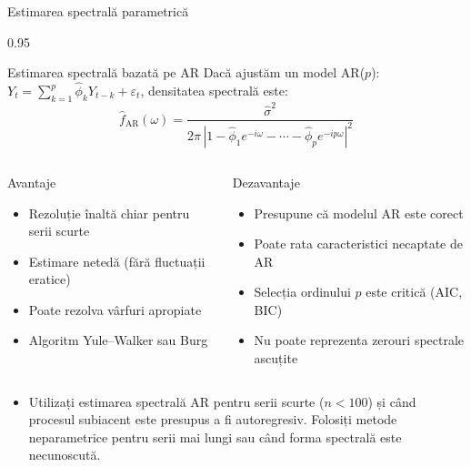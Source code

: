 \documentclass[9pt, aspectratio=169, t]{beamer}
\begin{document}
\begin{frame}{Estimarea spectrală parametrică}
    \begin{cminipage}{0.95\textwidth}
    \vspace{-2mm}
    \begin{block}{Estimarea spectrală bazată pe AR}
        {\small Dacă ajustăm un model AR($p$): $Y_t = \sum_{k=1}^p \hat{\phi}_k Y_{t-k} + \varepsilon_t$, densitatea spectrală este:
        \[
            \hat{f}_{\text{AR}}(\omega) = \frac{\hat{\sigma}^2}{2\pi\,|1 - \hat{\phi}_1 e^{-i\omega} - \cdots - \hat{\phi}_p e^{-ip\omega}|^2}
        \]
        }
    \end{block}
    \vspace{-2mm}
    \begin{columns}[T]
        \begin{exampleblock}{Avantaje}
            \begin{itemize}\setlength{\itemsep}{0pt}
                \item Rezoluție înaltă chiar pentru serii scurte
                \item Estimare netedă (fără fluctuații eratice)
                \item Poate rezolva vârfuri apropiate
                \item Algoritm Yule--Walker sau Burg
            \end{itemize}
        \end{exampleblock}

        \begin{alertblock}{Dezavantaje}
            \begin{itemize}\setlength{\itemsep}{0pt}
                \item Presupune că modelul AR este corect
                \item Poate rata caracteristici necaptate de AR
                \item Selecția ordinului $p$ este critică (AIC, BIC)
                \item Nu poate reprezenta zerouri spectrale ascuțite
            \end{itemize}
        \end{alertblock}
    \end{columns}
    \vspace{1mm}
    \begin{itemize}\setlength{\itemsep}{0pt}
        \item[\textbf{Recomandare practică}:] Utilizați estimarea spectrală AR pentru serii scurte ($n < 100$) și când procesul subiacent este presupus a fi autoregresiv. Folosiți metode neparametrice pentru serii mai lungi sau când forma spectrală este necunoscută.
    \end{itemize}
    \end{cminipage}
\end{frame}
\end{document}

